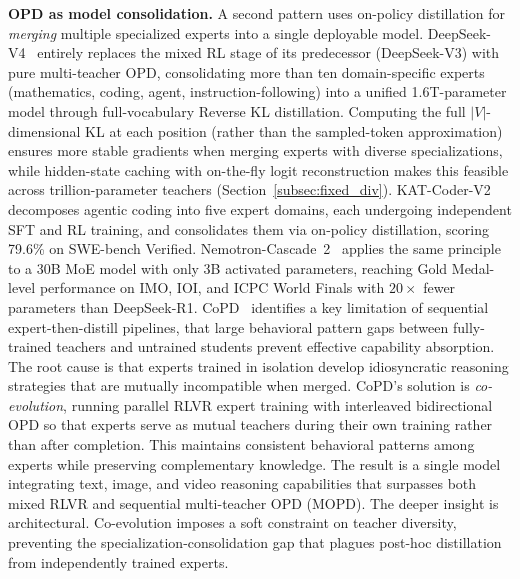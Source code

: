 \documentclass{article} %
\begin{document}
\textbf{OPD as model consolidation.} A second pattern uses on-policy distillation for \emph{merging} multiple specialized experts into a single deployable model. DeepSeek-V4~\citep{deepseekv4} entirely replaces the mixed RL stage of its predecessor (DeepSeek-V3) with pure multi-teacher OPD, consolidating more than ten domain-specific experts (mathematics, coding, agent, instruction-following) into a unified 1.6T-parameter model through full-vocabulary Reverse KL distillation. Computing the full $|V|$-dimensional KL at each position (rather than the sampled-token approximation) ensures more stable gradients when merging experts with diverse specializations, while hidden-state caching with on-the-fly logit reconstruction makes this feasible across trillion-parameter teachers (Section~\ref{subsec:fixed_div}). KAT-Coder-V2~\citep{2603.27703} decomposes agentic coding into five expert domains, each undergoing independent SFT and RL training, and consolidates them via on-policy distillation, scoring 79.6\% on SWE-bench Verified. Nemotron-Cascade~2~\citep{2603.19220} applies the same principle to a 30B MoE model with only 3B activated parameters, reaching Gold Medal-level performance on IMO, IOI, and ICPC World Finals with $20\times$ fewer parameters than DeepSeek-R1. CoPD~\citep{2604.27083} identifies a key limitation of sequential expert-then-distill pipelines, that large behavioral pattern gaps between fully-trained teachers and untrained students prevent effective capability absorption. The root cause is that experts trained in isolation develop idiosyncratic reasoning strategies that are mutually incompatible when merged. CoPD's solution is \emph{co-evolution}, running parallel RLVR expert training with interleaved bidirectional OPD so that experts serve as mutual teachers during their own training rather than after completion. This maintains consistent behavioral patterns among experts while preserving complementary knowledge. The result is a single model integrating text, image, and video reasoning capabilities that surpasses both mixed RLVR and sequential multi-teacher OPD (MOPD). The deeper insight is architectural. Co-evolution imposes a soft constraint on teacher diversity, preventing the specialization-consolidation gap that plagues post-hoc distillation from independently trained experts.
\end{document}
